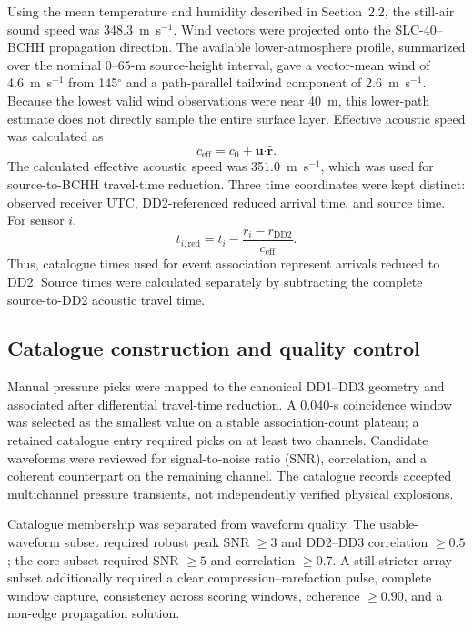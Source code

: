 \documentclass[]{seismica}
\begin{document}
Using the mean temperature and humidity described in Section~2.2, the
still-air sound speed was 348.3~m~s$^{-1}$. Wind vectors were projected onto
the SLC-40--BCHH propagation direction. The available lower-atmosphere profile,
summarized over the nominal 0--65-m source-height interval, gave a vector-mean
wind of 4.6~m~s$^{-1}$ from 145$^\circ$ and a path-parallel tailwind component
of 2.6~m~s$^{-1}$. Because the lowest valid wind observations were near 40~m,
this lower-path estimate does not directly sample the entire surface layer.
Effective acoustic speed was calculated as
\begin{equation}
 c_{\mathrm{eff}}=c_0+\mathbf{u}\boldsymbol{\cdot}\hat{\mathbf{r}}.
 \label{eq:effective_speed}
\end{equation}
The calculated effective acoustic speed was 351.0~m~s$^{-1}$, which was used
for source-to-BCHH travel-time reduction.
Three time coordinates were kept distinct: observed
receiver UTC, DD2-referenced reduced arrival time, and source time. For sensor
$i$,
\begin{equation}
 t_{i,\mathrm{red}}=t_i-\frac{r_i-r_{\mathrm{DD2}}}{c_{\mathrm{eff}}}.
 \label{eq:reduced_time}
\end{equation}
Thus, catalogue times used for event association represent arrivals reduced
to DD2. Source times were calculated separately by subtracting the complete
source-to-DD2 acoustic travel time.

\subsection{Catalogue construction and quality control}

Manual pressure picks were mapped to the canonical DD1--DD3 geometry and
associated after differential travel-time reduction. A 0.040-s coincidence
window was selected as the smallest value on a stable association-count
plateau; a retained catalogue entry required picks on at least two channels.
Candidate waveforms were reviewed for signal-to-noise ratio (SNR), correlation,
and a coherent counterpart on the remaining channel. The catalogue records
accepted multichannel pressure transients, not independently verified physical
explosions.

Catalogue membership was separated from waveform quality. The
usable-waveform subset required robust peak SNR $\geq3$ and DD2--DD3
correlation $\geq0.5$; the core subset required SNR $\geq5$ and correlation
$\geq0.7$. A still stricter array subset additionally required a clear
compression--rarefaction pulse, complete window capture, consistency across
scoring windows, coherence $\geq0.90$, and a non-edge propagation solution.
\end{document}
